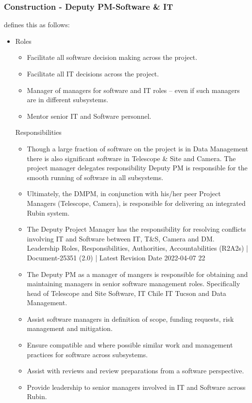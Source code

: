 \subsubsection{Construction - Deputy PM-Software \& IT} \label{sec:seputypm}
 defines this as follows:

\begin{itemize}
\item Roles
\begin{itemize}
\item Facilitate all software decision making across the project.
\item Facilitate all IT decisions across the project.
\item Manager of managers for software and IT roles – even if such managers are in different
subsystems.
\item Mentor senior IT and Software personnel.
\end{itemize}
Responsibilities
\begin{itemize}
\item Though a large fraction of software on the project is in Data Management there is also
significant software in Telescope \& Site and Camera. The project manager delegates
responsibility Deputy PM is responsible for the smooth running of software in all
subsystems.
\item Ultimately, the DMPM, in conjunction with his/her peer Project Managers (Telescope,
Camera), is responsible for delivering an integrated Rubin system.
\item The Deputy Project Manager has the responsibility for resolving conflicts involving IT
and Software between IT, T\&S, Camera and DM.
Leadership Roles, Responsibilities, Authorities, Accountabilities (R2A2s) | Document-25351 (2.0) | Latest Revision Date 2022-04-07
22
\item The Deputy PM as a manager of mangers is responsible for obtaining and maintaining
managers in senior software management roles. Specifically head of Telescope and
Site Software, IT Chile IT Tucson and Data Management.
\item Assist software managers in definition of scope, funding requests, risk management
and mitigation.
\item Ensure compatible and where possible similar work and management practices for
software across subsystems.
\item Assist with reviews and review preparations from a software perspective.
\item Provide leadership to senior managers involved in IT and Software across Rubin.

\end{itemize}
\end{itemize}
